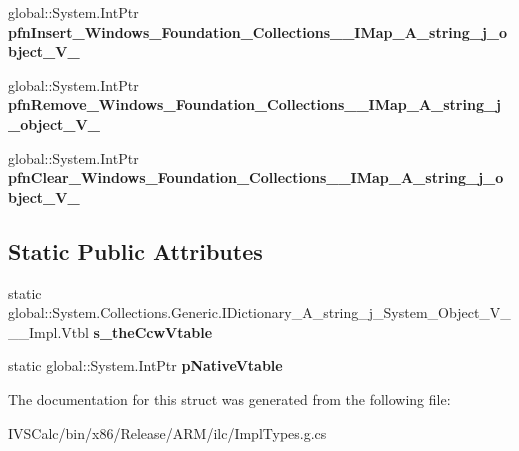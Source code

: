 \begin{DoxyCompactItemize}
global\+::\+System.\+Int\+Ptr {\bfseries pfn\+Insert\+\_\+\+Windows\+\_\+\+Foundation\+\_\+\+Collections\+\_\+\+\_\+\+I\+Map\+\_\+\+A\+\_\+string\+\_\+j\+\_\+object\+\_\+\+V\+\_\+}
\item 
\mbox{\label{struct_system_1_1_collections_1_1_generic_1_1_i_dictionary___a__string__j___system___object___v_______impl_1_1_vtbl_a3a2f06b7134fadfefc0a97aaa5cb18cb}} 
global\+::\+System.\+Int\+Ptr {\bfseries pfn\+Remove\+\_\+\+Windows\+\_\+\+Foundation\+\_\+\+Collections\+\_\+\+\_\+\+I\+Map\+\_\+\+A\+\_\+string\+\_\+j\+\_\+object\+\_\+\+V\+\_\+}
\item 
\mbox{\label{struct_system_1_1_collections_1_1_generic_1_1_i_dictionary___a__string__j___system___object___v_______impl_1_1_vtbl_a22050d28876dd234bfdf061d6078c19e}} 
global\+::\+System.\+Int\+Ptr {\bfseries pfn\+Clear\+\_\+\+Windows\+\_\+\+Foundation\+\_\+\+Collections\+\_\+\+\_\+\+I\+Map\+\_\+\+A\+\_\+string\+\_\+j\+\_\+object\+\_\+\+V\+\_\+}
\end{DoxyCompactItemize}
\subsection*{Static Public Attributes}
\begin{DoxyCompactItemize}
\item 
\mbox{\label{struct_system_1_1_collections_1_1_generic_1_1_i_dictionary___a__string__j___system___object___v_______impl_1_1_vtbl_a06ad26d5d67043a932bd9017bfac50f1}} 
static global\+::\+System.\+Collections.\+Generic.\+I\+Dictionary\+\_\+\+A\+\_\+string\+\_\+j\+\_\+\+System\+\_\+\+Object\+\_\+\+V\+\_\+\+\_\+\+\_\+\+Impl.\+Vtbl {\bfseries s\+\_\+the\+Ccw\+Vtable}
\item 
\mbox{\label{struct_system_1_1_collections_1_1_generic_1_1_i_dictionary___a__string__j___system___object___v_______impl_1_1_vtbl_ab11b58ffd6e4dbbec918a2e3a1cead7f}} 
static global\+::\+System.\+Int\+Ptr {\bfseries p\+Native\+Vtable}
\end{DoxyCompactItemize}


The documentation for this struct was generated from the following file\+:\begin{DoxyCompactItemize}
\item 
I\+V\+S\+Calc/bin/x86/\+Release/\+A\+R\+M/ilc/Impl\+Types.\+g.\+cs\end{DoxyCompactItemize}
